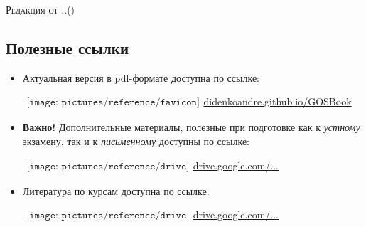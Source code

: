{\LARGE\scshape Редакция от \twodigit\day.\twodigit\month.\the\year \;(\currenttime)}\par 

\vspace*{-1\baselineskip}  
\begin{flushleft}
\section*{\Large Полезные ссылки}
\begin{itemize}[wide, labelwidth=!, labelindent=0pt, label=$\blacktriangleright$, noitemsep]
\item Актуальная версия в pdf-формате доступна по ссылке:

\qquad\href{https://didenkoandre.github.io/GOSBook}{$
\begin{array}{l}
\texttt{[image: pictures/reference/favicon]}
\end{array}
$\large didenkoandre.github.io/GOSBook}

\iffalse
\qquad\href{http://latexonline.cc/compile?git=https://github.com/DidenkoAndre/GOSBook&target=GOSBook.tex&download=GOSBook.pdf&command=pdflatex}{$
\begin{array}{l}
\texttt{[image: pictures/reference/latexonline]}
\end{array}
$\large latexonline.cc/...}

\qquad\href{https://www.dropbox.com/s/nly4ewbfcyrc8es/GOSBook.pdf?dl=0}{$
\begin{array}{l}
\texttt{[image: pictures/reference/dropbox]}
\end{array}
$\large dropbox.com/...}
\fi

\item \textbf{Важно!} Дополнительные материалы, полезные при подготовке как к \textit{устному} экзамену, так и к \textit{письменному} доступны по ссылке:

\qquad\href{https://drive.google.com/drive/u/0/folders/0BzuzEyNkpwYDYjVNcE0wa3hqWjA}{$
\begin{array}{l}
\texttt{[image: pictures/reference/drive]}
\end{array}
$\large drive.google.com/...}

\item Литература по курсам доступна по ссылке:

\qquad\href{https://drive.google.com/drive/u/0/folders/0BzuzEyNkpwYDcENXcV9jNWdwVlU}{$
\begin{array}{l}
\texttt{[image: pictures/reference/drive]}
\end{array}
$\large drive.google.com/...}


\end{itemize}
\end{flushleft}
